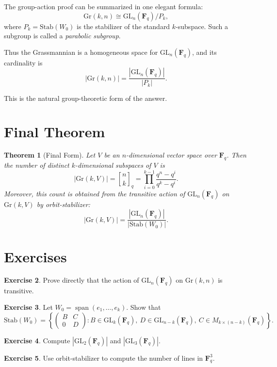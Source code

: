 \documentclass[11pt]{article}
\newtheorem{theorem}{Theorem}[section]
\theoremstyle{definition}
\newtheorem{exercise}[theorem]{Exercise}
\theoremstyle{remark}
\newcommand{\F}{\mathbf{F}}
\newcommand{\GL}{\mathrm{GL}}
\newcommand{\Gr}{\mathrm{Gr}}
\newcommand{\Stab}{\mathrm{Stab}}
\newcommand{\Span}{\operatorname{span}}
\newcommand{\qbinom}[2]{\genfrac{[}{]}{0pt}{}{#1}{#2}_q}
\begin{document}
	The group-action proof can be summarized in one elegant formula:
	\[
	\Gr(k,n)\cong \GL_n(\F_q)/P_k,
	\]
	where \(P_k=\Stab(W_0)\) is the stabilizer of the standard \(k\)-subspace. Such a subgroup is called a \emph{parabolic subgroup}.
	
	Thus the Grassmannian is a homogeneous space for \(\GL_n(\F_q)\), and its cardinality is
	\[
	|\Gr(k,n)|=\frac{|\GL_n(\F_q)|}{|P_k|}.
	\]
	
	This is the natural group-theoretic form of the answer.
	
	\section{Final Theorem}
	
	\begin{theorem}[Final Form]
		Let \(V\) be an \(n\)-dimensional vector space over \(\F_q\). Then the number of distinct \(k\)-dimensional subspaces of \(V\) is
		\[
		\boxed{
			|\Gr(k,V)|=\qbinom{n}{k}
			=
			\prod_{i=0}^{k-1}\frac{q^n-q^i}{q^k-q^i}
		}.
		\]
		Moreover, this count is obtained from the transitive action of \(\GL_n(\F_q)\) on \(\Gr(k,V)\) by orbit-stabilizer:
		\[
		|\Gr(k,V)|=\frac{|\GL_n(\F_q)|}{|\Stab(W_0)|}.
		\]
	\end{theorem}
	
	\section{Exercises}
	
	\begin{exercise}
		Prove directly that the action of \(\GL_n(\F_q)\) on \(\Gr(k,n)\) is transitive.
	\end{exercise}
	
	\begin{exercise}
		Let \(W_0=\Span(e_1,\dots,e_k)\). Show that
		\[
		\Stab(W_0)=
		\left\{
		\begin{pmatrix}
			B & C\\
			0 & D
		\end{pmatrix}
		:
		B\in \GL_k(\F_q),\ D\in \GL_{n-k}(\F_q),\ C\in M_{k\times(n-k)}(\F_q)
		\right\}.
		\]
	\end{exercise}
	
	\begin{exercise}
		Compute \(|\GL_2(\F_q)|\) and \(|\GL_3(\F_q)|\).
	\end{exercise}
	
	\begin{exercise}
		Use orbit-stabilizer to compute the number of lines in \(\F_q^3\).
	\end{exercise}
	
\end{document}
